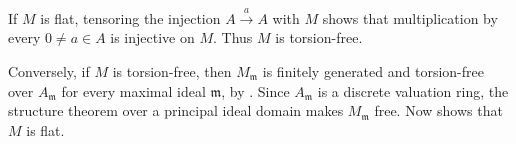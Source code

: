 If $M$ is flat, tensoring the injection $A\xrightarrow{a}A$ with $M$ shows that multiplication by every $0\ne a\in A$ is injective on $M$. Thus $M$ is torsion-free.

Conversely, if $M$ is torsion-free, then $M_{\mathfrak m}$ is finitely generated and torsion-free over $A_{\mathfrak m}$ for every maximal ideal $\mathfrak m$, by . Since $A_{\mathfrak m}$ is a discrete valuation ring, the structure theorem over a principal ideal domain makes $M_{\mathfrak m}$ free. Now  shows that $M$ is flat.
